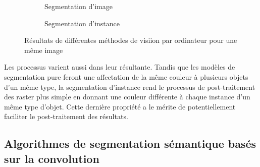 \begin{figure}
          \begin{subfigure}{0.4\textwidth}
            \centering
            \caption{Segmentation d'image}
          \end{subfigure}
          \begin{subfigure}{0.4\textwidth}
            \centering
            \caption{Segmentation d'instance}
          \end{subfigure}
          \caption{Résultats de différentes méthodes de visiion par ordinateur pour une même image}
          \label{fig:enter-label}
      \end{figure}
  Les processus varient aussi dans leur résultante. Tandis que les modèles de segmentation pure feront une affectation de la même couleur à plusieurs objets d'un même type, la segmentation d'instance rend le processus de post-traitement des raster plus simple en donnant une couleur différente à chaque instance d'un même type d'objet. Cette dernière propriété a le mérite de potentiellement faciliter le post-traitement des résultats.
  \subsection{Algorithmes de segmentation sémantique basés sur la convolution}

